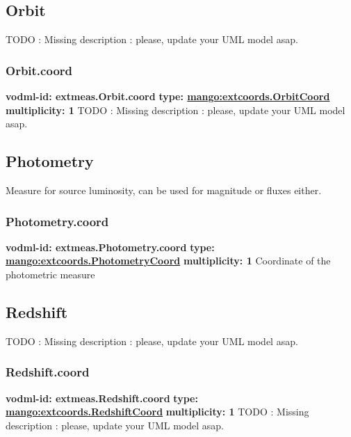   \subsection{Orbit}
  \label{sect:extmeas.Orbit}
    TODO : Missing description : please, update your UML model asap.

    \subsubsection{Orbit.coord}
      \textbf{vodml-id: extmeas.Orbit.coord} \newline
      \textbf{type: \hyperref[sect:extcoords.OrbitCoord]{mango:extcoords.OrbitCoord}} \newline
      \textbf{multiplicity: 1} \newline 
      TODO : Missing description : please, update your UML model asap.

  \subsection{Photometry}
  \label{sect:extmeas.Photometry}
    Measure for source luminosity, can be used for magnitude or fluxes either.

    \subsubsection{Photometry.coord}
      \textbf{vodml-id: extmeas.Photometry.coord} \newline
      \textbf{type: \hyperref[sect:extcoords.PhotometryCoord]{mango:extcoords.PhotometryCoord}} \newline
      \textbf{multiplicity: 1} \newline 
      Coordinate of the photometric measure

  \subsection{Redshift}
  \label{sect:extmeas.Redshift}
    TODO : Missing description : please, update your UML model asap.

    \subsubsection{Redshift.coord}
      \textbf{vodml-id: extmeas.Redshift.coord} \newline
      \textbf{type: \hyperref[sect:extcoords.RedshiftCoord]{mango:extcoords.RedshiftCoord}} \newline
      \textbf{multiplicity: 1} \newline 
      TODO : Missing description : please, update your UML model asap.

